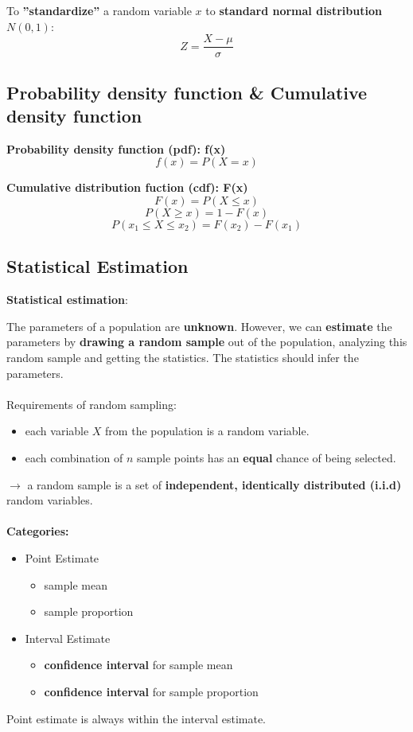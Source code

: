 To \textbf{''standardize''} a random variable $x$ to \textbf{standard normal distribution }
$N(0,1)$: $$Z = \frac{X - \mu}{\sigma}$$

\subsection{Probability density function \& Cumulative density function}
\textbf{Probability density function (pdf): f(x)} $$f(x) = P(X = x)$$

\textbf{Cumulative distribution fuction (cdf): F(x)} $$F(x) = P(X \leq x)$$ $$P(X \geq x) = 1 - F(x)$$  $$P(x_1 \leq X \leq x_2) = F(x_2) - F(x_1)$$

\subsection{Statistical Estimation}
\textbf{Statistical estimation}: 

The parameters of a population are \textbf{unknown}. However, we can \textbf{estimate} the parameters by \textbf{drawing a random sample} out of the population, analyzing this random sample and getting the statistics. The statistics should infer the parameters.
\\ \ \\
Requirements of random sampling: 
\begin{itemize}
	\item each variable $X$ from the population is a random variable. 
	\item each combination of $n$ sample points has an \textbf{equal} chance of being selected.  
	
\end{itemize}
	$\longrightarrow$ a random sample is a set of \textbf{independent, identically distributed (i.i.d)} random variables.
\\ \ \\
\textbf{Categories:}
\begin{itemize}
	\item Point Estimate
	\begin{itemize}
		\item sample mean
		\item sample proportion
	\end{itemize}

	\item Interval Estimate
	\begin{itemize}
		\item \textbf{confidence interval} for sample mean
		\item \textbf{confidence interval} for sample proportion
	\end{itemize}
\end{itemize}
Point estimate is always within the interval estimate.

